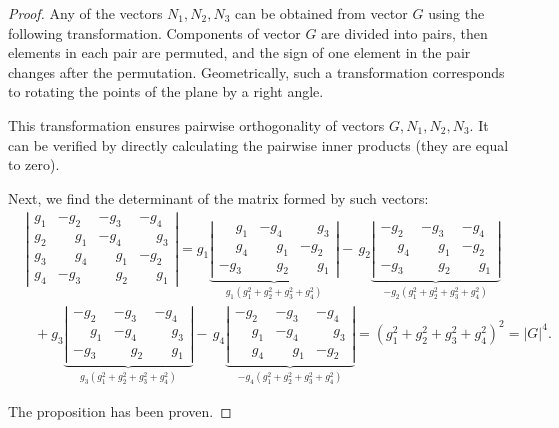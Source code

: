 \documentclass[10pt,reqno]{amsart}
\theoremstyle{plain}
\theoremstyle{remark}
\begin{document}
\begin{proof}
Any of the vectors $N_1,N_2,N_3$ can be obtained from vector $G$ using the following transformation. Components of vector $G$ are divided into pairs, then elements in each pair are permuted, and the sign of one element in the pair changes after the permutation. Geometrically, such a transformation corresponds to rotating the points of the plane by a right angle.

This transformation ensures pairwise orthogonality of vectors $G,N_1,N_2,N_3$. It can be verified by directly calculating the pairwise inner products (they are equal to zero).

Next, we find the determinant of the matrix formed by such vectors:
\begin{align*}
  & \left| \begin{array}{cccc}
    g_1 & -g_2 & -g_3 & -g_4 \\
    g_2 & \phantom{-}g_1 & -g_4 & \phantom{-}g_3 \\
    g_3 & \phantom{-}g_4 & \phantom{-}g_1 & -g_2 \\
    g_4 & -g_3 & \phantom{-}g_2 & \phantom{-}g_1
  \end{array} \right| = g_1 \underbrace{\left| \begin{array}{ccc}
    \phantom{-}g_1 & -g_4 & \phantom{-}g_3 \\
    \phantom{-}g_4 & \phantom{-}g_1 & -g_2 \\
    -g_3 & \phantom{-}g_2 & \phantom{-}g_1
  \end{array} \right|}_{g_1 (g_1^2 + g_2^2 + g_3^2 + g_4^2)} - \,
  g_2 \underbrace{\left| \begin{array}{ccc}
    -g_2 & -g_3 & -g_4 \\
    \phantom{-}g_4 & \phantom{-}g_1 & -g_2 \\
    -g_3 & \phantom{-}g_2 & \phantom{-}g_1
  \end{array} \right|}_{-g_2 (g_1^2 + g_2^2 + g_3^2 + g_4^2)} \\
  & \ \ \ {} + g_3 \underbrace{\left| \begin{array}{ccc}
    -g_2 & -g_3 & -g_4 \\
    \phantom{-}g_1 & -g_4 & \phantom{-}g_3 \\
    -g_3 & \phantom{-}g_2 & \phantom{-}g_1
  \end{array} \right|}_{g_3 (g_1^2 + g_2^2 + g_3^2 + g_4^2)} - \,
  g_4 \underbrace{\left| \begin{array}{ccc}
    -g_2 & -g_3 & -g_4 \\
    \phantom{-}g_1 & -g_4 & \phantom{-}g_3 \\
    \phantom{-}g_4 & \phantom{-}g_1 & -g_2
  \end{array} \right|}_{-g_4 (g_1^2 + g_2^2 + g_3^2 + g_4^2)} = (g_1^2 + g_2^2 + g_3^2 + g_4^2)^2 = |G|^4.
\end{align*}

The proposition has been proven.
\end{proof}
\end{document}
